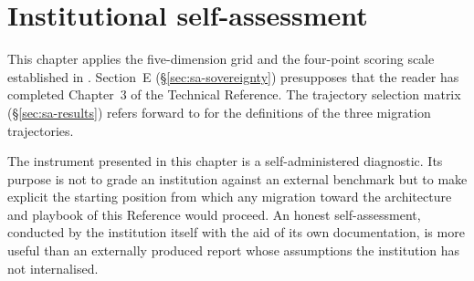 
\chapter{Institutional self-assessment}
\label{ch:self-assessment}

\begin{caveatbox}[Dependencies]
\noindent This chapter applies the five-dimension grid and the
four-point scoring scale established in
. Section~E
(\S\ref{sec:sa-sovereignty}) presupposes that the reader has
completed Chapter~3 of the Technical Reference. The trajectory
selection matrix (\S\ref{sec:sa-results}) refers forward to
 for the
definitions of the three migration trajectories.
\end{caveatbox}

The instrument presented in this chapter is a self-administered
diagnostic. Its purpose is not to grade an institution against an
external benchmark but to make explicit the starting position from
which any migration toward the architecture and playbook of this
Reference would proceed. An honest self-assessment, conducted by the
institution itself with the aid of its own documentation, is more
useful than an externally produced report whose assumptions the
institution has not internalised.

